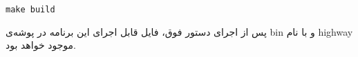 \begin{latin}
    \begin{lstlisting}
make build
    \end{lstlisting}
\end{latin}

پس از اجرای دستور فوق، فایل قابل اجرای این برنامه در پوشه‌ی bin و با نام highway موجود خواهد بود.












\cleardoublepage


